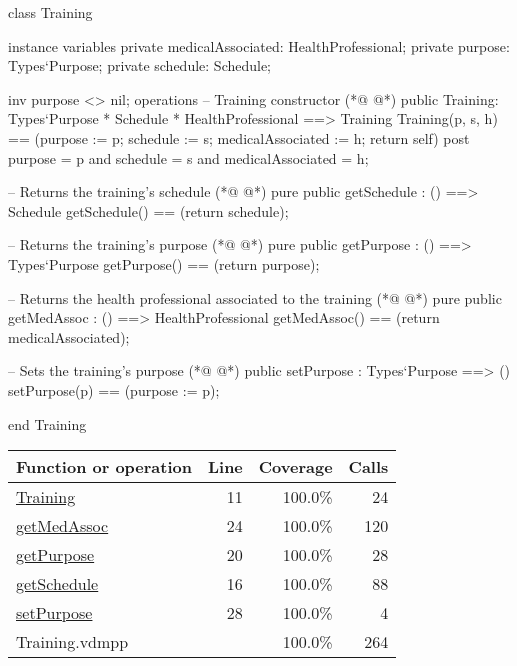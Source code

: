 \begin{vdmpp}[breaklines=true]
class Training
 
instance variables
 private medicalAssociated: HealthProfessional;
 private purpose: Types`Purpose;
 private schedule: Schedule;

 inv purpose <> nil;
operations
 -- Training constructor
(*@
\label{Training:11}
@*)
 public Training: Types`Purpose * Schedule * HealthProfessional ==> Training
   Training(p, s, h) == (purpose := p; schedule := s; medicalAssociated := h; return self)
 post purpose = p and schedule = s and medicalAssociated = h;
 
 -- Returns the training's schedule
(*@
\label{getSchedule:16}
@*)
 pure public getSchedule : () ==> Schedule
   getSchedule() == (return schedule);
 
 -- Returns the training's purpose
(*@
\label{getPurpose:20}
@*)
  pure public getPurpose : () ==> Types`Purpose
  getPurpose() == (return purpose); 
 
 -- Returns the health professional associated to the training
(*@
\label{getMedAssoc:24}
@*)
 pure public getMedAssoc : () ==> HealthProfessional
  getMedAssoc() == (return medicalAssociated); 
 
 -- Sets the training's purpose
(*@
\label{setPurpose:28}
@*)
 public setPurpose : Types`Purpose ==> ()
   setPurpose(p) == (purpose := p);
 
 end Training
\end{vdmpp}
\bigskip
\begin{longtable}{|l|r|r|r|}
\hline
Function or operation & Line & Coverage & Calls \\
\hline
\hline
\hyperref[Training:11]{Training} & 11&100.0\% & 24 \\
\hline
\hyperref[getMedAssoc:24]{getMedAssoc} & 24&100.0\% & 120 \\
\hline
\hyperref[getPurpose:20]{getPurpose} & 20&100.0\% & 28 \\
\hline
\hyperref[getSchedule:16]{getSchedule} & 16&100.0\% & 88 \\
\hline
\hyperref[setPurpose:28]{setPurpose} & 28&100.0\% & 4 \\
\hline
\hline
Training.vdmpp & & 100.0\% & 264 \\
\hline
\end{longtable}

